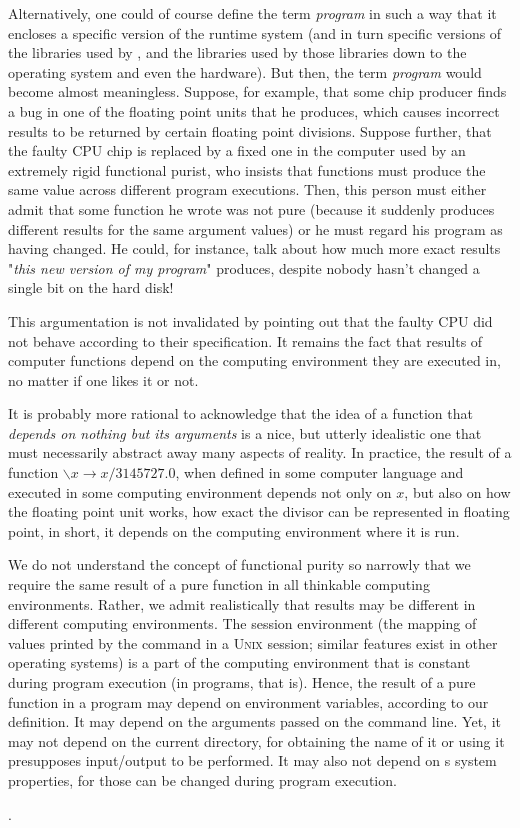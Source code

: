 \begin{description}
{Alternatively, one could of course define the term \emph{program} in such a way that it encloses a specific version of the \java{} runtime system (and in turn specific versions of the libraries used by \java{}, and the libraries used by those libraries down to the operating system and even the hardware). But then, the term \emph{program} would become almost meaningless.
Suppose, for example, that some chip producer finds a bug in one of the floating point units that he produces, which causes incorrect results to be returned by certain floating point divisions. Suppose further, that the faulty CPU chip is replaced by a fixed one in the computer used by an extremely rigid functional purist, who insists that functions must produce the same value across different program executions. Then, this person must either admit that some function he wrote was not pure (because it suddenly produces different results for the same argument values) or he must regard his program as having changed. He could, for instance, talk about how much more exact results "\emph{this new version of my program}"  produces, despite nobody hasn't changed a single bit on the hard disk!

This argumentation is not invalidated by pointing out that the faulty CPU did not behave according to their specification. It remains the fact that results of computer functions depend on the computing environment they are executed in, no matter if one likes it or not.

It is probably more rational to acknowledge that the idea of a function that \emph{depends on nothing but its arguments} is a nice, but utterly idealistic one that must necessarily abstract away many aspects of reality. In practice, the result of a function $\backslash x \rightarrow x/3145727.0$, when defined in some computer language and executed in some computing environment depends not only on $x$, but also on how the floating point unit works, how exact the divisor can be represented in floating point, in short, it depends on the computing environment where it is run. 

We do not understand the concept of functional purity so narrowly that we require the same result of a pure function in all thinkable computing environments. Rather, we admit realistically that results may be different in different computing environments. The session environment (the mapping of values printed by the command  in a \textsc{Unix} session; similar features exist in other operating systems) is a part of the computing environment that is constant during program execution (in \java{} programs, that is). Hence, the result of a pure function in a program may depend on environment variables, according to our definition. It may depend on the arguments passed on the command line. Yet, it may not depend on the current directory, for obtaining the name of it or using it presupposes input/output to be performed. It may also not depend on \java{}s system properties, for those can be changed during program execution.}.


\end{description}
